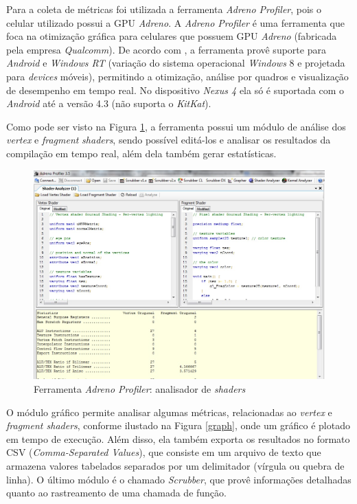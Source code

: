 	Para a coleta de métricas foi utilizada a ferramenta \textit{Adreno Profiler}, pois o celular utilizado possui a GPU \textit{Adreno}. A \textit{Adreno Profiler} é uma ferramenta que foca na otimização gráfica para celulares que possuem GPU \textit{Adreno} (fabricada pela empresa \textit{Qualcomm}). De acordo com  \cite{adp}, a ferramenta provê suporte para \textit{Android} e \textit{Windows RT} (variação do sistema operacional \textit{Windows} 8  e projetada para \textit{devices} móveis), permitindo a otimização, análise por quadros e visualização de desempenho em tempo real. No dispositivo \textit{Nexus 4} ela só é suportada com o \textit{Android} até a versão 4.3 (não suporta o \textit{KitKat}). 

	Como pode ser visto na Figura \ref{adrenoProfiler}, a ferramenta possui um módulo de análise dos \textit{vertex} e \textit{fragment} \textit{shaders}, sendo possível editá-los e analisar os resultados da compilação em tempo real, além dela também gerar estatísticas.  

	\begin{figure}[ht]
	\centering
		\includegraphics[keepaspectratio=true,scale=0.4]{figuras/shader_analyzer.jpg}
	\caption{Ferramenta \textit{Adreno Profiler}: analisador de \textit{shaders}}
	\label{adrenoProfiler}
	\end{figure}

	O módulo gráfico permite analisar algumas métricas, relacionadas ao \textit{vertex} e \textit{fragment shaders}, conforme ilustado na Figura \ref{graph}, onde um gráfico é plotado em tempo de execução. Além disso, ela também exporta os resultados no formato CSV (\textit{Comma-Separated Values}), que consiste em um arquivo de texto que armazena valores tabelados separados por um delimitador (vírgula ou quebra de linha). O último módulo é o chamado \textit{Scrubber}, que provê informações detalhadas quanto ao rastreamento de uma chamada de função. 

